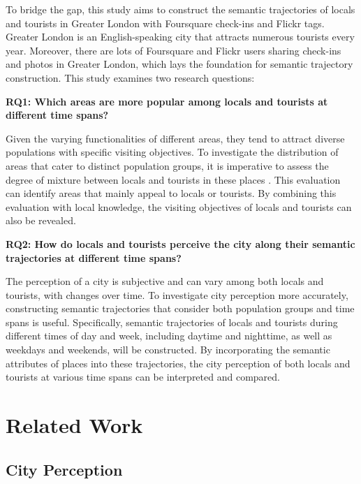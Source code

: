 \documentclass{article}
\begin{document}
To bridge the gap, this study aims to construct the semantic trajectories of locals and tourists in Greater London with Foursquare check-ins and Flickr tags. Greater London is an English-speaking city that attracts numerous tourists every year. Moreover, there are lots of Foursquare and Flickr users sharing check-ins and photos in Greater London, which lays the foundation for semantic trajectory construction. This study examines two research questions:

\textbf{RQ1: Which areas are more popular among locals and tourists at different time spans?}

Given the varying functionalities of different areas, they tend to attract diverse populations with specific visiting objectives. To investigate the distribution of areas that cater to distinct population groups, it is imperative to assess the degree of mixture between locals and tourists in these places \citep{li_analyzing_2018}. This evaluation can identify areas that mainly appeal to locals or tourists. By combining this evaluation with local knowledge, the visiting objectives of locals and tourists can also be revealed.

\textbf{RQ2: How do locals and tourists perceive the city along their semantic trajectories at different time spans?}

The perception of a city is subjective and can vary among both locals and tourists, with changes over time. To investigate city perception more accurately, constructing semantic trajectories that consider both population groups and time spans is useful. Specifically, semantic trajectories of locals and tourists during different times of day and week, including daytime and nighttime, as well as weekdays and weekends, will be constructed. By incorporating the semantic attributes of places into these trajectories, the city perception of both locals and tourists at various time spans can be interpreted and compared.

\clearpage

\section{Related Work}
\subsection{City Perception}
\end{document}

